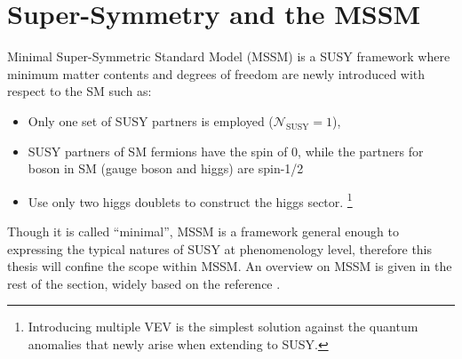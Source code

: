 \section{Super-Symmetry and the MSSM}
Minimal Super-Symmetric Standard Model (MSSM) is a SUSY framework where minimum matter contents and degrees of freedom are newly introduced with respect to the SM such as:
\begin{itemize}
\item Only one set of SUSY partners is employed ($\mathcal{N}_{\mathrm{SUSY}}=1$),
\item SUSY partners of SM fermions have the spin of 0, while the partners for boson in SM (gauge boson and higgs) are spin-1/2
\item Use only two higgs doublets to construct the higgs sector.
\footnote{Introducing multiple VEV is the simplest solution against the quantum anomalies that newly arise when extending to SUSY.}
\end{itemize}

Though it is called ``minimal'', MSSM is a framework general enough to expressing the typical natures of SUSY at phenomenology level, therefore this thesis will confine the scope within MSSM. An overview on MSSM is given in the rest of the section, widely based on the reference \cite{SUSYPrimer}. \\


